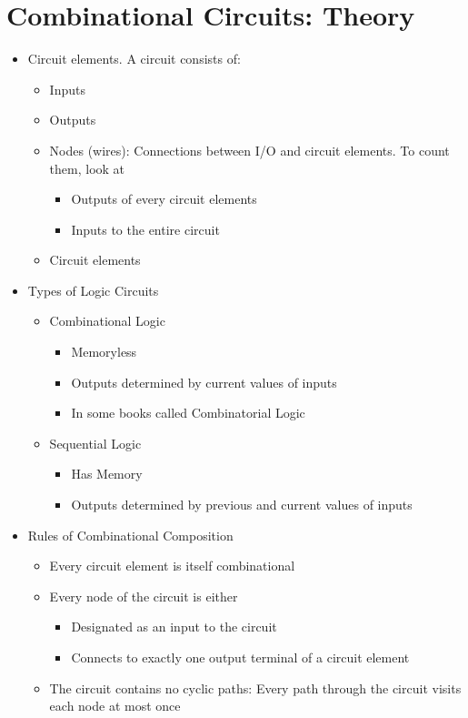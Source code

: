 \documentclass[a4paper]{article}
\begin{document}
\section{Combinational Circuits: Theory}
\begin{itemize}
\item Circuit elements. A circuit consists of:
\begin{itemize}
\item Inputs
\item Outputs
\item Nodes (wires): Connections between I/O and circuit elements. To count them, look at
\begin{itemize}
\item Outputs of every circuit elements
\item Inputs to the entire circuit
\end{itemize}
\item Circuit elements
\end{itemize}
\item Types of Logic Circuits
\begin{itemize}
\item Combinational Logic
\begin{itemize}
\item Memoryless
\item Outputs determined by current values of inputs
\item In some books called Combinatorial Logic
\end{itemize}
\item Sequential Logic
\begin{itemize}
\item Has Memory
\item Outputs determined by previous and current values of inputs
\end{itemize}
\end{itemize}
\item Rules of Combinational Composition
\begin{itemize}
\item Every circuit element is itself combinational
\item Every node of the circuit is either
\begin{itemize}
\item Designated as an input to the circuit
\item Connects to exactly one output terminal of a circuit element
\end{itemize}
\item The circuit contains no cyclic paths: Every path through the circuit visits each node at most once


\end{itemize}
\end{itemize}
\end{document}
